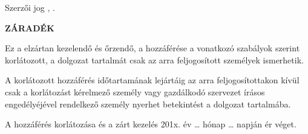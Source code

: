 \selecthungarian
\begin{flushleft}
Szerzői jog {\textcopyright} \szerzo, \the\year.
\end{flushleft}

\vspace{0.5cm}

\begin{center}
\textbf{ZÁRADÉK}\\
\end{center}

\vspace{0.5cm}

Ez a \MakeLowercase{\gpkmunkatipusHU} elzártan kezelendő és őrzendő, a hozzáférése a vonatkozó szabályok szerint korlátozott, a dolgozat tartalmát csak az arra feljogosított személyek ismerhetik.

A korlátozott hozzáférés időtartamának lejártáig az arra feljogosítottakon kívül csak a korlátozást kérelmező személy vagy gazdálkodó szervezet írásos engedélyéjével rendelkező személy nyerhet betekintést a dolgozat tartalmába.

\vspace{0.3cm}

A hozzáférés korlátozása és a zárt kezelés 201x. év … hónap … napján ér véget.

\vfill
\clearpage
\thispagestyle{empty} %

\selectthesislanguage
